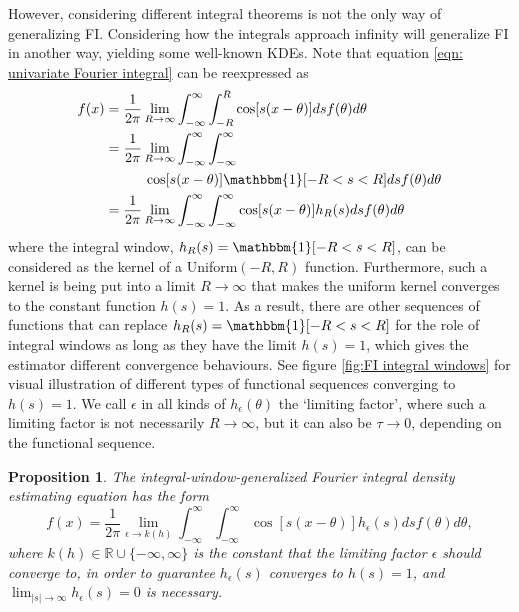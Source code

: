 \documentclass[%
 reprint,
 amsmath,amssymb,
 aps,
]{revtex4-2}
\newtheorem{proposition}[theorem]{Proposition}
\def\R{\mathbb{R}}
\begin{document}
However, considering different integral theorems is not the only way of generalizing FI. Considering how the integrals approach infinity will generalize FI in another way, yielding some well-known KDEs. Note that equation \eqref{eqn: univariate Fourier integral} can be reexpressed as
\begin{align*} 
    f(x) & = \frac{1}{2\pi} \lim_{R \to \infty} \int_{-\infty}^\infty \int_{-R}^R \cos[s(x-\theta)]ds f(\theta)d\theta \\
    & = \frac{1}{2\pi} \lim_{R \to \infty} \int_{-\infty}^\infty \int_{-\infty}^\infty \\
    & \hspace{1cm}\cos[s(x-\theta)] \mathbbm{1}[-R < s < R] ds f(\theta) d\theta \\
    & = \frac{1}{2\pi} \lim_{R \to \infty} \int_{-\infty}^\infty \int_{-\infty}^\infty \cos[s(x-\theta)]h_R(s)ds f(\theta)d\theta
\end{align*}
where the integral window, $h_R(s) = \mathbbm{1}[-R < s < R]$, can be considered as the kernel of a Uniform$(-R, R)$ function. Furthermore, such a kernel is being put into a limit $R \to \infty$ that makes the uniform kernel converges to the constant function $h(s) = 1$. As a result, there are other sequences of functions that can replace $h_R(s) = \mathbbm{1}[-R < s < R]$ for the role of integral windows as long as they have the limit $h(s) = 1$, which gives the estimator different convergence behaviours. See figure \ref{fig:FI integral windows} for visual illustration of different types of functional sequences converging to $h(s) = 1$. We call $\epsilon$ in all kinds of $h_\epsilon(\theta)$ the `limiting factor', where such a limiting factor is not necessarily $R \to \infty$, but it can also be $\tau \to 0$, depending on the functional sequence.
\begin{proposition}
    The integral-window-generalized Fourier integral density estimating equation has the form
    \begin{equation} \label{eqn: integral window h(s)}
        f(x) = \frac{1}{2\pi} \lim_{\epsilon \to k(h)} \int_{-\infty}^\infty \int_{-\infty}^\infty \cos[s(x-\theta)]h_\epsilon(s)ds f(\theta)d\theta,
    \end{equation}
    where $k(h) \in \R \cup \{-\infty, \infty\}$ is the constant that the limiting factor $\epsilon$ should converge to, in order to guarantee $h_\epsilon(s)$ converges to $h(s) = 1$, and $\displaystyle\lim_{|s| \to \infty} h_\epsilon(s) = 0$ is necessary.
\end{proposition}
\end{document}
